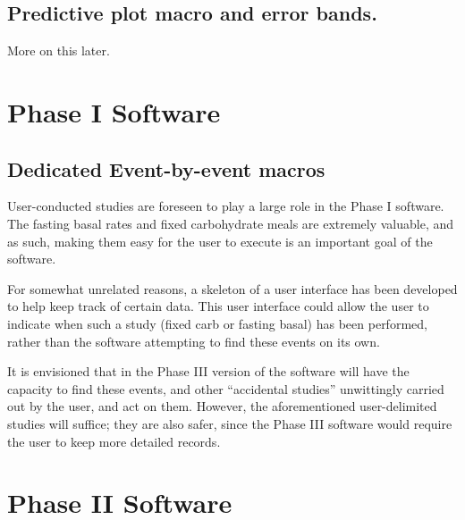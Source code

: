\subsection{Predictive plot macro and error bands.} More on this later.


\section{Phase I Software}

\subsection{Dedicated Event-by-event macros}

User-conducted studies are foreseen to play a large role in the Phase I software. The fasting basal 
rates and fixed carbohydrate meals are extremely valuable, and as such, making them easy for the user 
to execute is an important goal of the software.

For somewhat unrelated reasons, a skeleton of a user interface has been developed to help keep track 
of certain data. This user interface could allow the user to indicate when such a study (fixed carb 
or fasting basal) has been performed, rather than the software attempting to find these events on 
its own.

It is envisioned that in the Phase III version of the software will have the capacity to find these 
events, and other ``accidental studies'' unwittingly carried out by the user, and act on them. 
However, the aforementioned user-delimited studies will suffice; they are also safer, since the Phase 
III software would require the user to keep more detailed records.















\section{Phase II Software}


